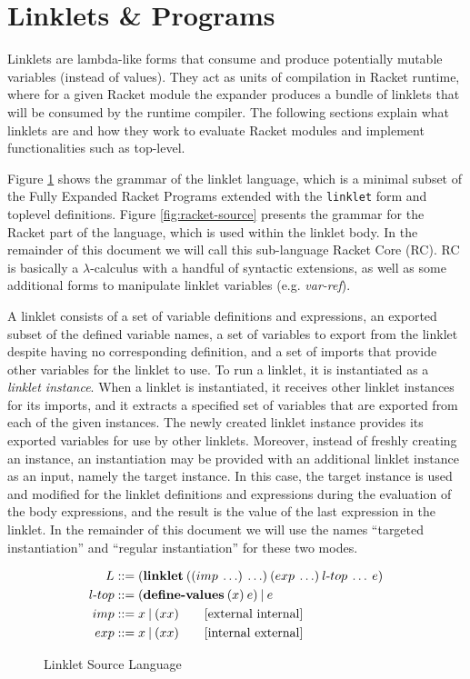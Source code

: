 \documentclass[sigplan,screen,anonymous]{acmart}
\def\dash {\text{-}}
\begin{document}
\section{Linklets \& Programs}

Linklets are lambda-like forms that consume and produce potentially
mutable variables (instead of values). They act as units of
compilation in Racket runtime, where for a given Racket module the
expander produces a bundle of linklets that will be consumed by the
runtime compiler. The following sections explain what linklets are and
how they work to evaluate Racket modules and implement functionalities
such as top-level.

Figure \ref{fig:linklet-source} shows the grammar of the linklet
language, which is a minimal subset of the Fully Expanded Racket
Programs extended with the \verb|linklet| form and toplevel
definitions. Figure \ref{fig:racket-source} presents the grammar for
the Racket part of the language, which is used within the linklet
body. In the remainder of this document we will call this sub-language
Racket Core (RC). RC is basically a $\lambda$-calculus with a handful of
syntactic extensions, as well as some additional forms to manipulate
linklet variables (e.g. \textit{var-ref}).

A linklet consists of a set of variable definitions and expressions,
an exported subset of the defined variable names, a set of variables
to export from the linklet despite having no corresponding definition,
and a set of imports that provide other variables for the linklet to
use. To run a linklet, it is instantiated as a {\it linklet
  instance}. When a linklet is instantiated, it receives other linklet
instances for its imports, and it extracts a specified set of
variables that are exported from each of the given instances. The
newly created linklet instance provides its exported variables for use
by other linklets. Moreover, instead of freshly creating an instance,
an instantiation may be provided with an additional linklet instance
as an input, namely the target instance. In this case, the target
instance is used and modified for the linklet definitions and
expressions during the evaluation of the body expressions, and the
result is the value of the last expression in the linklet. In the
remainder of this document we will use the names ``targeted
instantiation'' and ``regular instantiation'' for these two modes.

\begin{figure}[tbp]
  \begin{align*}
    L  &::= (\textbf{linklet}\:((imp\: \ldots)\: \ldots)\:(exp\: \ldots)\:l\dash top\:\ldots\:e)\\
    l\dash top &::= (\textbf{define\dash values}\:(x)\:e)\:|\:e \\
    imp &::= x\:|\:(x x) \tag*{[external internal]}\\
    exp &::= x\:|\:(x x) \tag*{[internal external]}
  \end{align*}
  \caption{Linklet Source Language}
  \label{fig:linklet-source}
\end{figure}
\end{document}
